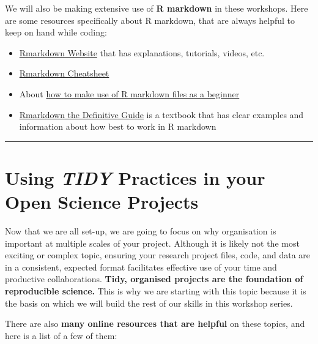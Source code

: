 \documentclass[
]{book}
\begin{document}
We will also be making extensive use of \textbf{R markdown} in these workshops. Here are some resources specifically about R markdown, that are always helpful to keep on hand while coding:

\begin{itemize}
\item
  \href{https://rmarkdown.rstudio.com/lesson-1.html}{Rmarkdown Website} that has explanations, tutorials, videos, etc.
\item
  \href{https://rstudio.github.io/cheatsheets/rmarkdown.pdf}{Rmarkdown Cheatsheet}
\item
  About \href{https://environmentalcomputing.net/getting-started-with-r/rstudio-notebooks/}{how to make use of R markdown files as a beginner}
\item
  \href{https://bookdown.org/yihui/rmarkdown/}{Rmarkdown the Definitive Guide} is a textbook that has clear examples and information about how best to work in R markdown
\end{itemize}

\begin{center}\rule{0.5\linewidth}{0.5pt}\end{center}

\section{\texorpdfstring{Using \emph{TIDY} Practices in your Open Science Projects}{Using TIDY Practices in your Open Science Projects}}\label{using-tidy-practices-in-your-open-science-projects}

Now that we are all set-up, we are going to focus on why organisation is important at multiple scales of your project. Although it is likely not the most exciting or complex topic, ensuring your research project files, code, and data are in a consistent, expected format facilitates effective use of your time and productive collaborations. \textbf{Tidy, organised projects are the foundation of reproducible science.} This is why we are starting with this topic because it is the basis on which we will build the rest of our skills in this workshop series.

There are also \textbf{many online resources that are helpful} on these topics, and here is a list of a few of them:
\end{document}
